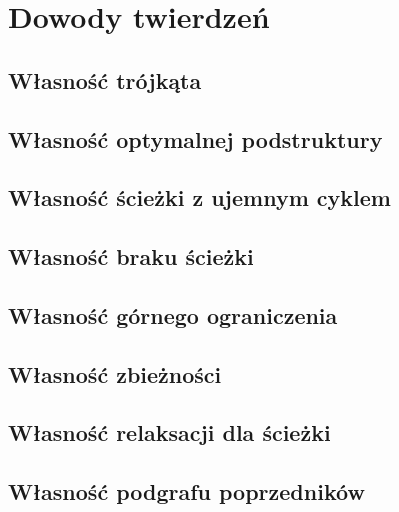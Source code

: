 \chapter{Dowody twierdzeń}

\section{Własność trójkąta}


\section{Własność optymalnej podstruktury}


\section{Własność ścieżki z ujemnym cyklem}

\section{Własność braku ścieżki}

\section{Własność górnego ograniczenia}

\section{Własność zbieżności}

\section{Własność relaksacji dla ścieżki}

\section{Własność podgrafu poprzedników}

